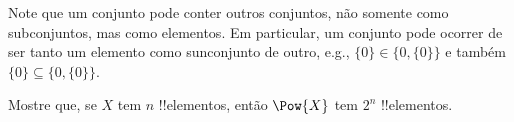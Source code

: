 \documentclass[../../../include/open-logic-section]{subfiles}
\begin{document}

\begin{explain}
Note que um conjunto pode conter outros conjuntos, não somente como
subconjuntos, mas como elementos. Em particular, um conjunto pode ocorrer
de ser tanto um elemento como sunconjunto de outro, e.g.,
$\{0\} \in \{0, \{0\}\}$ e também $\{0\} \subseteq \{0, \{0\}\}$.
\end{explain}






\begin{prob}
Mostre que, se $X$ tem $n$ !!{elemento}s, então $\Pow{X}$ tem $2^n$
!!{elemento}s.
\end{prob}

\end{document}
